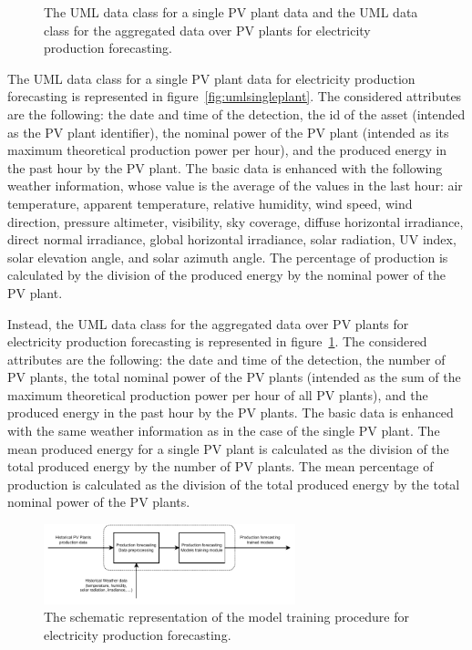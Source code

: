 \begin{figure}[H]
\begin{minipage}[b]{8.5cm}
\subcaption{}
\label{fig:umlproduction}
\end{minipage}
\caption{ The UML data class for a single PV plant data and  the UML data class for the aggregated data over PV plants for electricity production forecasting.}
\end{figure}

The UML data class for a single PV plant data for electricity production forecasting is represented in figure~\ref{fig:umlsingleplant}.
The considered attributes are the following: the date and time of the detection, the id of the asset (intended as the PV plant identifier), the nominal power of the PV plant (intended as its maximum theoretical production power per hour), and the produced energy in the past hour by the PV plant.
The basic data is enhanced with the following weather information, whose value is the average of the values in the last hour: air temperature, apparent temperature, relative humidity, wind speed, wind direction, pressure altimeter, visibility, sky coverage, diffuse horizontal irradiance, direct normal irradiance, global horizontal irradiance, solar radiation, UV index, solar elevation angle, and solar azimuth angle.
The percentage of production is calculated by the division of the produced energy by the nominal power of the PV plant.

Instead, the UML data class for the aggregated data over PV plants for electricity production forecasting is represented in figure~\ref{fig:umlproduction}.
The considered attributes are the following: the date and time of the detection, the number of PV plants, the total nominal power of the PV plants (intended as the sum of the maximum theoretical production power per hour of all PV plants), and the produced energy in the past hour by the PV plants.
The basic data is enhanced with the same weather information as in the case of the single PV plant.
The mean produced energy for a single PV plant is calculated as the division of the total produced energy by the number of PV plants.
The mean percentage of production is calculated as the division of the total produced energy by the total nominal power of the PV plants.

\begin{figure}[H]
\centering
\includegraphics[width=0.65\textwidth]{images/system_model_training_production}
\caption{The schematic representation of the model training procedure for electricity production forecasting.}
\label{fig:modeltrainingproduction}
\end{figure}

